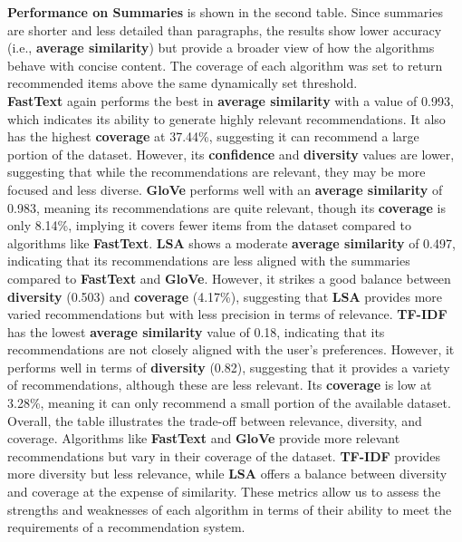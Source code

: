 \documentclass[10pt, oneside,english,hidelinks,a4paper]{article}
\begin{document}
\begin{multicols}{2}
\noindent
\textbf{Performance on Summaries} is shown in the second table. Since summaries are shorter and less detailed than paragraphs, the results show lower accuracy (i.e., \textbf{average similarity}) but provide a broader view of how the algorithms behave with concise content. The coverage of each algorithm was set to return recommended items above the same dynamically set threshold.\\
\noindent
\textbf{FastText} again performs the best in \textbf{average similarity} with a value of 0.993, which indicates its ability to generate highly relevant recommendations. It also has the highest \textbf{coverage} at 37.44\%, suggesting it can recommend a large portion of the dataset. However, its \textbf{confidence} and \textbf{diversity} values are lower, suggesting that while the recommendations are relevant, they may be more focused and less diverse. 
\noindent
\textbf{GloVe} performs well with an \textbf{average similarity} of 0.983, meaning its recommendations are quite relevant, though its \textbf{coverage} is only 8.14\%, implying it covers fewer items from the dataset compared to algorithms like \textbf{FastText}.
\noindent
\textbf{LSA} shows a moderate \textbf{average similarity} of 0.497, indicating that its recommendations are less aligned with the summaries compared to \textbf{FastText} and \textbf{GloVe}. However, it strikes a good balance between \textbf{diversity} (0.503) and \textbf{coverage} (4.17\%), suggesting that \textbf{LSA} provides more varied recommendations but with less precision in terms of relevance.
\noindent
\textbf{TF-IDF} has the lowest \textbf{average similarity} value of 0.18, indicating that its recommendations are not closely aligned with the user's preferences. However, it performs well in terms of \textbf{diversity} (0.82), suggesting that it provides a variety of recommendations, although these are less relevant. Its \textbf{coverage} is low at 3.28\%, meaning it can only recommend a small portion of the available dataset.
\noindent
Overall, the table illustrates the trade-off between relevance, diversity, and coverage. Algorithms like \textbf{FastText} and \textbf{GloVe} provide more relevant recommendations but vary in their coverage of the dataset. \textbf{TF-IDF} provides more diversity but less relevance, while \textbf{LSA} offers a balance between diversity and coverage at the expense of similarity. These metrics allow us to assess the strengths and weaknesses of each algorithm in terms of their ability to meet the requirements of a recommendation system.\\




\end{multicols}
\end{document}
